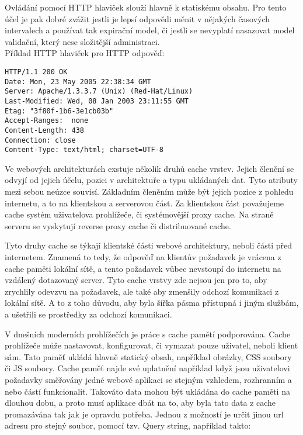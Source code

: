 \documentclass[12pt]{article}
\begin{document}
Ovládání pomocí HTTP hlaviček slouží hlavně k statiskému obsahu. Pro tento účel je pak dobré zvážit jestli je lepsí odpovědi měnit v nějakých časových intervalech a používat tak expirační model, či jestli se nevyplatí nasazovat model validační, který nese složitější administraci.\\
\clearpage
Příklad HTTP hlaviček pro HTTP odpověď:
\begin{scriptsize}
\begin{verbatim}
HTTP/1.1 200 OK
Date: Mon, 23 May 2005 22:38:34 GMT
Server: Apache/1.3.3.7 (Unix) (Red-Hat/Linux)
Last-Modified: Wed, 08 Jan 2003 23:11:55 GMT
Etag: "3f80f-1b6-3e1cb03b"
Accept-Ranges:  none
Content-Length: 438
Connection: close
Content-Type: text/html; charset=UTF-8
\end{verbatim}
\end{scriptsize}

Ve webových architekturách exstuje několik druhů cache vrstev. Jejich členění se odvyjí od jejich účelu, pozici v architektuře a typu ukládaných dat. Tyto atributy mezi sebou neúzce souvisí. Základním členěním může být jejich pozice z pohledu internetu, a to na klientskou a serverovou část. Za klientskou část považujeme cache systém uživatelova prohlížeče, či systémovější proxy cache. Na straně serveru se vyskytují reverse proxy cache či distribuované cache.

\obrazek
{}

Tyto druhy cache se týkají klientské části webové architektury, neboli části před internetem. Znamená to tedy, že odpověď na klientův požadavek je vrácena z cache paměti lokální sítě, a tento požadavek vůbec nevstoupí do internetu na vzdálený dotazovaný server. Tyto cache vrstvy zde nejsou jen pro to, aby zrychlily odevzvu na požadavek, ale také aby zmenšily odchozí komunikaci z lokální sítě. A to z toho důvodu, aby byla šířka pásma přístupná i jiným službám, a ušetřili se prostředky za odchozí komunikaci.

V dnešních moderních prohlížečích je práce s cache pamětí podporována. Cache prohlížeče může nastavovat, konfigurovat, či vymazat pouze uživatel, neboli klient sám. Tato paměť ukládá hlavně statický obsah, například obrázky, CSS soubory či JS soubory. Cache paměť najde své uplatnění například když jsou uživatelovi požadavky směřovány jedné webové aplikaci se stejným vzhledem, rozhranním a nebo částí funkcionalit. Takováto data mohou být ukládána do cache paměti na dlouhou dobu, a proto musí aplikace dbát na to, aby byla tato data z cache promazávána tak jak je opravdu potřeba. Jednou z možností je určit jinou url adresu pro stejný soubor, pomocí tzv. Query string, například takto:
\end{document}

